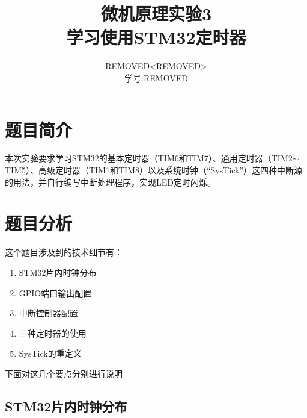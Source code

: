 \documentclass{ctexart}
\author{REMOVED<REMOVED>\\学号:REMOVED}
\title{微机原理实验3\\学习使用STM32定时器}
\begin{document}
\begin{titlepage}
\maketitle
\thispagestyle{empty}
\newpage
\tableofcontents
\thispagestyle{empty}
\end{titlepage}

\setcounter{page}{1}
\lstset{language=C, 
		numbers=left, 
		frame=single,
		breaklines=true,
		breakautoindent=false,
		numberstyle=\tiny,
		fontadjust,
		basicstyle=\footnotesize
		}

\section{题目简介} 

本次实验要求学习STM32的基本定时器（TIM6和TIM7）、通用定时器（TIM2$\sim$TIM5）、高级定时器（TIM1和TIM8）以及系统时钟（“SysTick”）这四种中断源的用法，并自行编写中断处理程序，实现LED定时闪烁。

\section{题目分析}

这个题目涉及到的技术细节有：
\begin{enumerate}[1.]
\item STM32片内时钟分布
\item GPIO端口输出配置
\item 中断控制器配置
\item 三种定时器的使用
\item SysTick的重定义
\end{enumerate}
下面对这几个要点分别进行说明

\subsection{STM32片内时钟分布}
\end{document}
